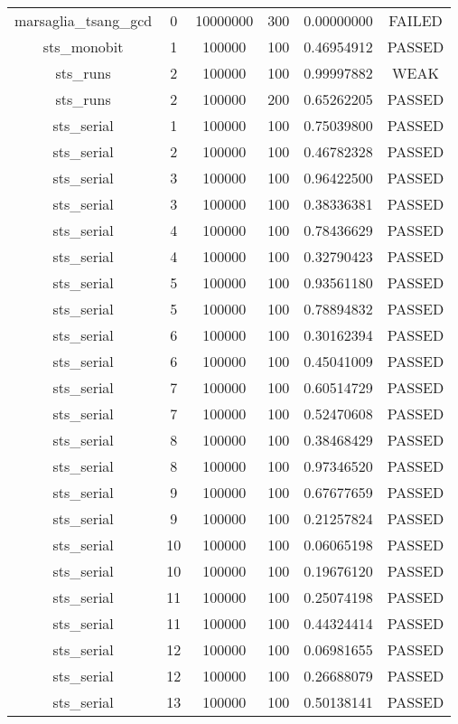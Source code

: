 \begin{longtable}{cccccc}
marsaglia\_tsang\_gcd & 0 & 10000000 & 300 & 0.00000000 & FAILED \\
sts\_monobit & 1 & 100000 & 100 & 0.46954912 & PASSED \\
sts\_runs & 2 & 100000 & 100 & 0.99997882 & WEAK \\
sts\_runs & 2 & 100000 & 200 & 0.65262205 & PASSED \\
sts\_serial & 1 & 100000 & 100 & 0.75039800 & PASSED \\
sts\_serial & 2 & 100000 & 100 & 0.46782328 & PASSED \\
sts\_serial & 3 & 100000 & 100 & 0.96422500 & PASSED \\
sts\_serial & 3 & 100000 & 100 & 0.38336381 & PASSED \\
sts\_serial & 4 & 100000 & 100 & 0.78436629 & PASSED \\
sts\_serial & 4 & 100000 & 100 & 0.32790423 & PASSED \\
sts\_serial & 5 & 100000 & 100 & 0.93561180 & PASSED \\
sts\_serial & 5 & 100000 & 100 & 0.78894832 & PASSED \\
sts\_serial & 6 & 100000 & 100 & 0.30162394 & PASSED \\
sts\_serial & 6 & 100000 & 100 & 0.45041009 & PASSED \\
sts\_serial & 7 & 100000 & 100 & 0.60514729 & PASSED \\
sts\_serial & 7 & 100000 & 100 & 0.52470608 & PASSED \\
sts\_serial & 8 & 100000 & 100 & 0.38468429 & PASSED \\
sts\_serial & 8 & 100000 & 100 & 0.97346520 & PASSED \\
sts\_serial & 9 & 100000 & 100 & 0.67677659 & PASSED \\
sts\_serial & 9 & 100000 & 100 & 0.21257824 & PASSED \\
sts\_serial & 10 & 100000 & 100 & 0.06065198 & PASSED \\
sts\_serial & 10 & 100000 & 100 & 0.19676120 & PASSED \\
sts\_serial & 11 & 100000 & 100 & 0.25074198 & PASSED \\
sts\_serial & 11 & 100000 & 100 & 0.44324414 & PASSED \\
sts\_serial & 12 & 100000 & 100 & 0.06981655 & PASSED \\
sts\_serial & 12 & 100000 & 100 & 0.26688079 & PASSED \\
sts\_serial & 13 & 100000 & 100 & 0.50138141 & PASSED \\

\end{longtable}
